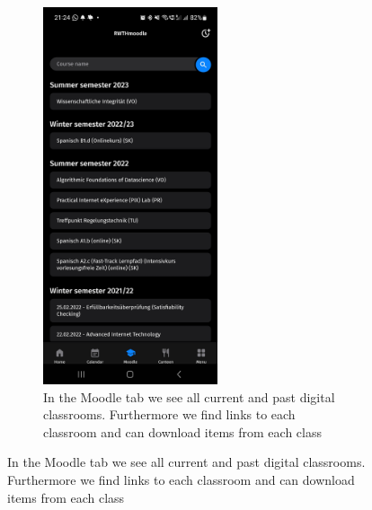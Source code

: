 \begin{figure}[t!]
\begin{subfigure}[T]{0.3\linewidth}
		\label{fig:app_caldener}
	\end{subfigure}
	\hfill
	\begin{subfigure}[T]{0.3\textwidth}
		\includegraphics[height=30em]{figures/Screenshot_moodle_RWTHApp.jpg}
		\caption{In the Moodle tab we see all current and past digital classrooms. Furthermore we find links to each classroom and can download items from each class}
		\label{fig:app_moodle}
	\end{subfigure}
	\label{fig:app_1}
\end{figure}

